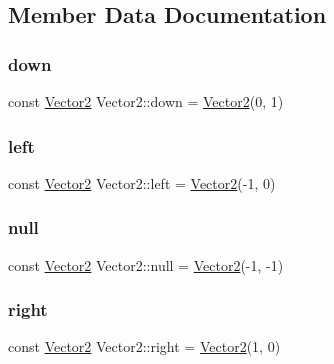 \subsection{Member Data Documentation}
\mbox{\label{struct_vector2_a64cb9ddeb42abbcfa527c3e2660ffef9}} 
\subsubsection{\texorpdfstring{down}{down}}
{\footnotesize\ttfamily const \mbox{\hyperlink{struct_vector2}{Vector2}} Vector2\+::down = \mbox{\hyperlink{struct_vector2}{Vector2}}(0, 1)\hspace{0.3cm}{\ttfamily [static]}}

\mbox{\label{struct_vector2_aaad26bbee0364de1e6a8676215886a2f}} 
\subsubsection{\texorpdfstring{left}{left}}
{\footnotesize\ttfamily const \mbox{\hyperlink{struct_vector2}{Vector2}} Vector2\+::left = \mbox{\hyperlink{struct_vector2}{Vector2}}(-\/1, 0)\hspace{0.3cm}{\ttfamily [static]}}

\mbox{\label{struct_vector2_a2c6e0149051082f87c4f63f97e07c7ae}} 
\subsubsection{\texorpdfstring{null}{null}}
{\footnotesize\ttfamily const \mbox{\hyperlink{struct_vector2}{Vector2}} Vector2\+::null = \mbox{\hyperlink{struct_vector2}{Vector2}}(-\/1, -\/1)\hspace{0.3cm}{\ttfamily [static]}}

\mbox{\label{struct_vector2_aa9712253176cedb918592990df5ea611}} 
\subsubsection{\texorpdfstring{right}{right}}
{\footnotesize\ttfamily const \mbox{\hyperlink{struct_vector2}{Vector2}} Vector2\+::right = \mbox{\hyperlink{struct_vector2}{Vector2}}(1, 0)\hspace{0.3cm}{\ttfamily [static]}}


